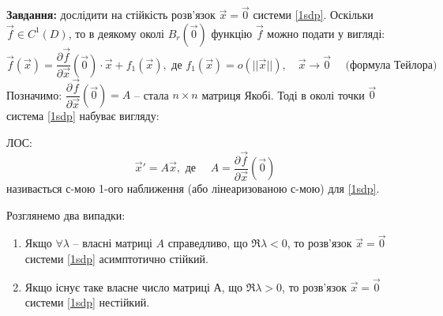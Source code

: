 \documentclass[14pt,a4paper]{scrartcl}
\theoremstyle{definition}
\theoremstyle{definition}
\theoremstyle{definition}
\begin{document}
\textbf{Завдання: } дослідити на стійкість розв'язок $\overrightarrow{x} = \overrightarrow{0}$ системи \eqref{1sdp}. Оскільки $\overrightarrow{f} \in C^1(D)$, то в деякому околі $B_r(\overrightarrow{0})$ функцію $\overrightarrow{f}$ можно подати у вигляді:
\begin{equation*}
  \overrightarrow{f}(\overrightarrow{x}) = \dfrac{\partial \overrightarrow{f}}{\partial \overrightarrow{x}}(\overrightarrow{0}) \cdot \overrightarrow{x} + f_1(\overrightarrow{x}), \text{ де } f_1(\overrightarrow{x}) = o(||\overrightarrow{x}||), \quad \overrightarrow{x} \rightarrow \overrightarrow{0} \quad \text{ (формула Тейлора)}
\end{equation*}
Позначимо: $\dfrac{\partial \overrightarrow{f}}{\partial \overrightarrow{x}}(\overrightarrow{0}) = A$ -- стала $n \times n$ матриця Якобі. Тоді в околі точки $\overrightarrow{0}$ система \eqref{1sdp} набуває вигляду:
\begin{center}
\end{center}
\bd ЛОС:
\begin{equation*}
  \overrightarrow{x}' = A\overrightarrow{x}, \text{ де } \quad A = \dfrac{\partial\overrightarrow{f}}{\partial\overrightarrow{x}}(\overrightarrow{0})
\end{equation*}
називається с-мою 1-ого наближення (або лінеаризованою с-мою) для \eqref{1sdp}.
\ed
\begin{boxteo}
  Розглянемо два випадки:
  \begin{enumerate}
    \item Якщо $\forall \lambda$ -- власні матриці $A$ справедливо, що $\Re \lambda < 0$, то розв'язок $\overrightarrow{x} = \overrightarrow{0}$ системи \eqref{1sdp} асимптотично стійкий.
    \item Якщо існує таке власне число матриці $А$, що $\Re \lambda > 0$, то розв'язок $\overrightarrow{x} = \overrightarrow{0}$ системи \eqref{1sdp} нестійкий.
  \end{enumerate}
\end{boxteo}
\end{document}
